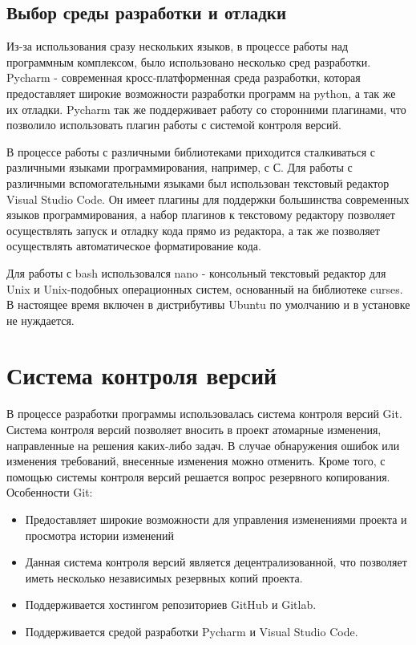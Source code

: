 \subsection{Выбор среды разработки и отладки}
Из-за использования сразу нескольких языков, в процессе работы над программным комплексом, было использовано несколько сред разработки.
Pycharm - современная кросс-платформенная среда разработки, которая предоставляет широкие возможности разработки программ на python, а так же их отладки. Pycharm так же поддерживает работу со сторонними плагинами, что позволило использовать плагин работы с системой контроля версий.

В процессе работы с различными библиотеками приходится сталкиваться с различными языками программирования, например, с С. Для работы с различными вспомогательными языками был использован текстовый редактор Visual Studio Code. Он имеет плагины для поддержки большинства современных языков программирования, а набор плагинов к текстовому редактору позволяет осуществлять запуск и отладку кода прямо из редактора, а так же позволяет осуществлять автоматическое форматирование кода.

Для работы с bash использовался nano - консольный текстовый редактор для Unix и Unix-подобных операционных систем, основанный на библиотеке curses. В настоящее время включен в дистрибутивы Ubuntu по умолчанию и в установке не нуждается.

\section{Система контроля версий}
В процессе разработки программы использовалась система контроля
версий Git.
Система контроля версий позволяет вносить в проект атомарные
изменения, направленные на решения каких-либо задач. В случае
обнаружения ошибок или изменения требований, внесенные изменения
можно отменить.
Кроме того, с помощью системы контроля версий решается вопрос
резервного копирования.
Особенности Git:
\begin{itemize}
\item Предоставляет широкие возможности для управления изменениями
	проекта и просмотра истории изменений
 \item Данная система контроля версий является децентрализованной, что
позволяет иметь несколько независимых резервных копий проекта.
\item Поддерживается хостингом репозиториев GitHub и Gitlab.
\item Поддерживается средой разработки Pycharm и Visual Studio Code.
\end{itemize}

